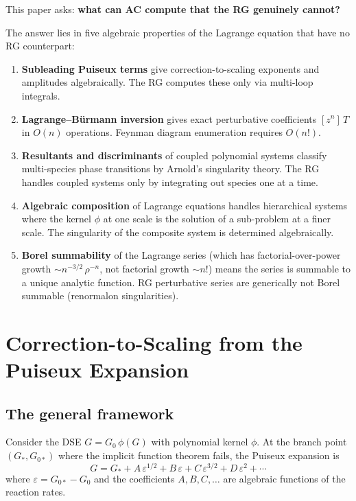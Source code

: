 \documentclass[11pt,a4paper]{article}
\theoremstyle{definition}
\begin{document}
This paper asks: \textbf{what can AC compute that the RG genuinely
cannot?}

The answer lies in five algebraic properties of the Lagrange equation
that have no RG counterpart:

\begin{enumerate}[leftmargin=2em]
\item \textbf{Subleading Puiseux terms} give correction-to-scaling
exponents and amplitudes algebraically. The RG computes these only
via multi-loop integrals.

\item \textbf{Lagrange--B\"urmann inversion} gives exact perturbative
coefficients $[z^n]\,T$ in $O(n)$ operations. Feynman diagram
enumeration requires $O(n!)$.

\item \textbf{Resultants and discriminants} of coupled polynomial
systems classify multi-species phase transitions by Arnold's
singularity theory. The RG handles coupled systems only by
integrating out species one at a time.

\item \textbf{Algebraic composition} of Lagrange equations handles
hierarchical systems where the kernel $\phi$ at one scale is the
solution of a sub-problem at a finer scale. The singularity of the
composite system is determined algebraically.

\item \textbf{Borel summability} of the Lagrange series (which has
factorial-over-power growth $\sim n^{-3/2}\,\rho^{-n}$, not
factorial growth $\sim n!$) means the series is summable to a unique
analytic function. RG perturbative series are generically not Borel
summable (renormalon singularities).
\end{enumerate}


\section{Correction-to-Scaling from the Puiseux Expansion}
\label{sec:corrections}

\subsection{The general framework}

Consider the DSE $G = G_0\,\phi(G)$ with polynomial kernel $\phi$.
At the branch point $(G_*, G_{0*})$ where the implicit function theorem
fails, the Puiseux expansion is
\begin{equation}
G = G_* + A\,\varepsilon^{1/2} + B\,\varepsilon + C\,\varepsilon^{3/2}
+ D\,\varepsilon^2 + \cdots
\label{eq:puiseux_full}
\end{equation}
where $\varepsilon = G_{0*} - G_0$ and the coefficients $A, B, C, \ldots$
are algebraic functions of the reaction rates.
\end{document}
